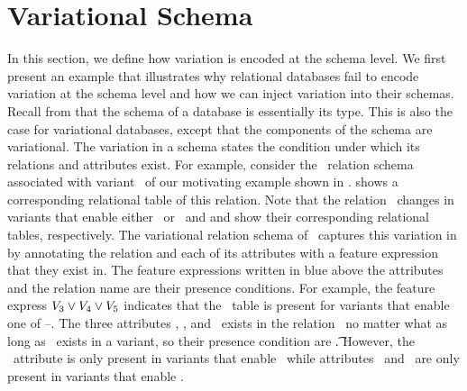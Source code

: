 \section{Variational Schema}
\label{sec:vsch}

In this section, we define how variation is encoded at the schema level. We first 
present an example that
 illustrates why relational databases fail to encode
variation at the schema level and how we can inject variation into their schemas.
Recall from  that the schema of a database is essentially its type.
This is also the case for variational databases, except that the components 
of the schema are variational.
The  variation in a schema states the condition under which its relations and
attributes exist.
%
For example, consider the \empbio\ relation schema associated with 
variant \vThree\ of our motivating example shown in .
 shows a corresponding relational table of this relation. 
% 
Note that the relation \empbio\ changes in variants that enable either \vFour\ or \vFive\
and  and  show their corresponding relational tables, 
respectively.
%
The variational relation schema of \empbio\ captures this variation
in \tabref{empbio-vsch} by annotating the relation and each of its attributes with
 a feature expression that they exist in.
%
The feature expressions written in blue above the attributes and the relation name
are their presence conditions. 
For example, the feature express $\vThree \vee \vFour \vee \vFive$ indicates that the
\empbio\ table is present for variants that enable one of \vThree--\vFive. 
%
The three attributes 
\empno, \sex, and \birthdate\ exists in the relation \empbio\ no matter what as long as
\empbio\ exists in a variant, so their presence condition are \t. 
However, the \name\ attribute is only present in variants
that enable \vFour\ while attributes \fname\ and \lname\ are only present in variants
that enable \vFive.



